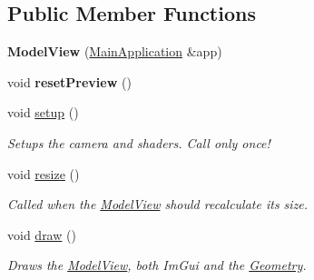 \subsection*{Public Member Functions}
\begin{DoxyCompactItemize}
\item 
\mbox{\label{classpepr3d_1_1_model_view_a599453dcbeead48f23193e0305f24e75}} 
{\bfseries Model\+View} (\mbox{\hyperlink{classpepr3d_1_1_main_application}{Main\+Application}} \&app)
\item 
\mbox{\label{classpepr3d_1_1_model_view_a9f5861e62821a38aac0de71d98019037}} 
void {\bfseries reset\+Preview} ()
\item 
\mbox{\label{classpepr3d_1_1_model_view_a76ad73738050d3aabb681b53e5ea8398}} 
void \mbox{\hyperlink{classpepr3d_1_1_model_view_a76ad73738050d3aabb681b53e5ea8398}{setup}} ()
\begin{DoxyCompactList}\small\item\em Setups the camera and shaders. Call only once! \end{DoxyCompactList}\item 
\mbox{\label{classpepr3d_1_1_model_view_ab25e5abfcab1d8869e2ef78b44c98721}} 
void \mbox{\hyperlink{classpepr3d_1_1_model_view_ab25e5abfcab1d8869e2ef78b44c98721}{resize}} ()
\begin{DoxyCompactList}\small\item\em Called when the \mbox{\hyperlink{classpepr3d_1_1_model_view}{Model\+View}} should recalculate its size. \end{DoxyCompactList}\item 
\mbox{\label{classpepr3d_1_1_model_view_a3336add9f3f59fb474713d4552590a5c}} 
void \mbox{\hyperlink{classpepr3d_1_1_model_view_a3336add9f3f59fb474713d4552590a5c}{draw}} ()
\begin{DoxyCompactList}\small\item\em Draws the \mbox{\hyperlink{classpepr3d_1_1_model_view}{Model\+View}}, both Im\+Gui and the \mbox{\hyperlink{classpepr3d_1_1_geometry}{Geometry}}. \end{DoxyCompactList}\item 
\mbox{\label{classpepr3d_1_1_model_view_ab428e44311e1ada48f4224f1cfd32915}} 

\end{DoxyCompactItemize}

